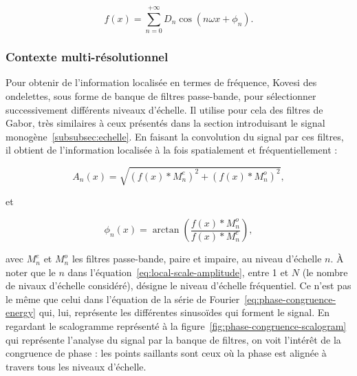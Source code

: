 \begin{equation}
    f(x) = \sum_{n=0}^{+\infty} D_n\cos(n\omega x + \phi_n).
    \label{eq:phase-congruence-energy}
\end{equation}


\subsubsection{Contexte multi-résolutionnel}

Pour obtenir de l'information localisée en termes de fréquence, Kovesi des ondelettes, sous forme de banque de filtres passe-bande, pour sélectionner successivement différents niveaux d'échelle. Il utilise pour cela des filtres de Gabor, très similaires à ceux présentés dans la section introduisant le signal monogène~\ref{subsubsec:echelle}. En faisant la convolution du signal par ces filtres, il obtient de l'information localisée à la fois spatialement et fréquentiellement :

\begin{equation}
    A_n(x) = \sqrt{(f(x)*M^e_n)^2 + (f(x)*M^o_n)^2},
    \label{eq:local-scale-amplitude}
\end{equation}

et

\begin{equation}
    \phi_n(x) = \arctan\left(\frac{f(x)*M^o_n}{f(x)*M^e_n}\right),
\end{equation}

avec $M^e_n$ et $M^o_n$ les filtres passe-bande, paire et impaire, au niveau d'échelle $n$. À noter que le $n$ dans l'équation~\ref{eq:local-scale-amplitude}, entre 1 et $N$ (le nombre de nivaux d'échelle considéré), désigne le niveau d'échelle fréquentiel. Ce n'est pas le même que celui dans l'équation de la série de Fourier~\ref{eq:phase-congruence-energy} qui, lui, représente les différentes sinusoïdes qui forment le signal. En regardant le scalogramme représenté à la figure~\ref{fig:phase-congruence-scalogram} qui représente l'analyse du signal par la banque de filtres, on voit l'intérêt de la congruence de phase : les points saillants sont ceux où la phase est alignée à travers tous les niveaux d'échelle.

\bigskip

